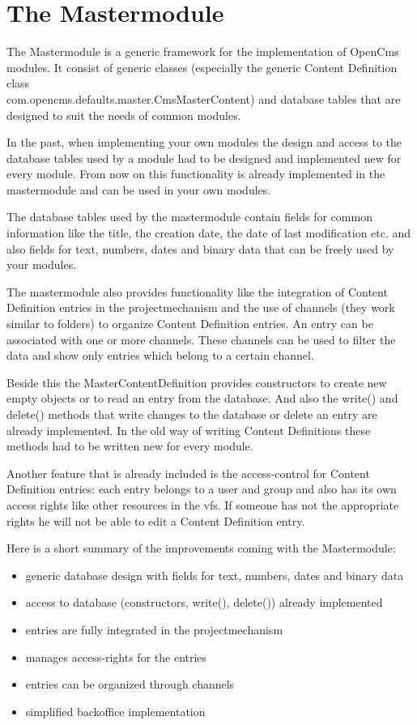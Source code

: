 \chapter {The Mastermodule}
\label{Mastermodule}

The Mastermodule is a generic framework for the implementation of 
OpenCms modules. 
It consist of generic classes (especially the generic Content Definition class \\
{\class com.opencms.defaults.master.CmsMasterContent}) and database tables that are
designed to suit the needs of common modules.

In the past, when implementing your own modules the design and access to the database tables
used by a module had to be designed and implemented new for every module.
From now on this functionality is already implemented in the mastermodule and can be used
in your own modules.

The database tables used by the mastermodule contain fields for common information like the title,
the creation date, the date of last modification etc. and also fields for 
text, numbers, dates and binary data that can be freely used by your modules.

The mastermodule also provides functionality like the integration of Content Definition entries in the
projectmechanism and the use of channels (they work similar to folders) to organize Content Definition entries.
An entry can be associated with one or more channels.
These channels can be used to filter the data and show only entries which belong to a certain channel.

Beside this the MasterContentDefinition provides constructors to create new empty objects or to read an 
entry from the database. And also the {\meth write()} and {\meth delete()} methods that write
changes to the database or delete an entry are already implemented. In the old way of writing Content Definitions
these methods had to be written new for every module.

Another feature that is already included is the access-control for Content Definition entries: each
entry belongs to a user and group and also has its own access rights like other resources in the vfs.
If someone has not the appropriate rights he will not be able to edit a Content Definition entry.

Here is a short summary of the improvements coming with the Mastermodule:

\begin{itemize}
\item generic database design with fields for text, numbers, dates and binary data
\item access to database (constructors, {\meth write()}, {\meth delete()}) already implemented
\item entries are fully integrated in the projectmechanism
\item manages access-rights for the entries
\item entries can be organized through channels
\item simplified backoffice implementation
\end{itemize}



